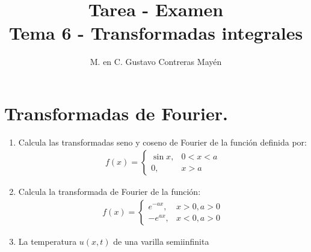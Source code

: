 
\title{Tarea - Examen \\ \large {Tema 6 - Transformadas integrales} \vspace{-3ex}}
\author{M. en C. Gustavo Contreras Mayén}
\date{ }

\vspace{-4cm}
\maketitle
\fontsize{14}{14}\selectfont
\section{Transformadas de Fourier.}
\begin{enumerate}
\item Calcula las transformadas seno y coseno de Fourier de la función definida por:
\begin{align*}
f(x) = \begin{cases}
\sin x, & 0 < x < a \\
0, & x > a
\end{cases}
\end{align*}
\item Calcula la transformada de Fourier de la función:
\begin{align*}
f(x) = \begin{cases}
e^{-a x}, & x > 0, a > 0 \\
-e^{a x}, & x < 0, a > 0
\end{cases}
\end{align*}
\item La temperatura $u (x, t)$ de una varilla semiinfinita

\end{enumerate}
